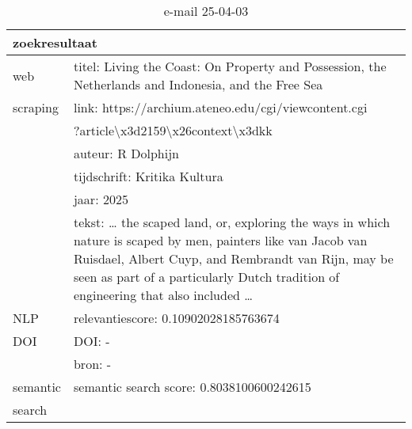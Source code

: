 \begin{table}[h!]
    \caption{e-mail 25-04-03}
    \centering
    \begin{tabularx}{\textwidth}{|p{4cm}|X|} 
        \hline
        \multicolumn{2}{|X|}{\textbf{zoekresultaat}} \\
        \hline
        web &titel: Living the Coast: On Property and Possession, the Netherlands and Indonesia, and the Free Sea\\
        scraping&link: https://archium.ateneo.edu/cgi/viewcontent.cgi\\&?article\textbackslash x3d2159\textbackslash x26context\textbackslash x3dkk\\
        &auteur: R Dolphijn\\
        &tijdschrift: Kritika Kultura\\
        &jaar: 2025\\
        &tekst: … the scaped land, or, exploring the ways in which nature is scaped by men, painters like van Jacob van Ruisdael, Albert Cuyp, and Rembrandt van Rijn, may be seen as part of a particularly Dutch tradition of engineering that also included …\\
        \hline
        NLP&relevantiescore: 0.10902028185763674\\
        \hline
        DOI&DOI: -\\
        &bron: -\\
        \hline
        semantic&semantic search score: 0.8038100600242615\\
        search&\\
        \hline
    \end{tabularx}
    \label{table:email20250403}
\end{table}
